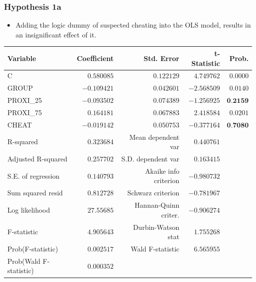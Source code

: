 \documentclass{beamer} %
\theoremstyle{definition}
\begin{document}
	\begin{frame}
		\frametitle{Hypothesis 1a}
		\centering
		\begin{itemize}
			\item Adding the logic dummy of suspected cheating into the OLS model, results in an insignificant effect of it.
		\end{itemize}
	\begin{table}[!htbp]
		\centering
		\tiny
		\begin{tabular}{lrrrr}
			\hline
			Variable & Coefficient & Std. Error & t-Statistic & Prob. \\
			\hline
			C & $0.580085$  & $0.122129$  & $4.749762$  & $0.0000$ \\
			GROUP & $-0.109421$ & $0.042601$  & $-2.568509$ & $0.0140$ \\
			PROXI\_25 & $-0.093502$ & $0.074389$  & $-1.256925$ & $\textbf{0.2159}$ \\
			PROXI\_75 & $0.164181$  & $0.067883$  & $2.418584$  & $0.0201$ \\
			CHEAT & $-0.019142$ & $0.050753$  & $-0.377164$ & $\textbf{0.7080}$ \\
			\hline
			R-squared & $0.323684$ & Mean dependent var & $0.440761$ &  \\
			Adjusted R-squared & $0.257702$ & S.D. dependent var & $0.163415$ &  \\
			S.E. of regression & $0.140793$ & Akaike info criterion & $-0.980732$ &  \\
			Sum squared resid & $0.812728$ & Schwarz criterion & $-0.781967$ &  \\
			Log likelihood & $27.55685$ & Hannan-Quinn criter. & $-0.906274$ &  \\
			F-statistic & $4.905643$ & Durbin-Watson stat & $1.755268$ &  \\
			Prob(F-statistic) & $0.002517$ & Wald F-statistic & $6.565955$ &  \\
			Prob(Wald F-statistic) & $0.000352$ &  &  &  \\
			\hline
		\end{tabular}
	\end{table}
	\end{frame}
	
\end{document}

